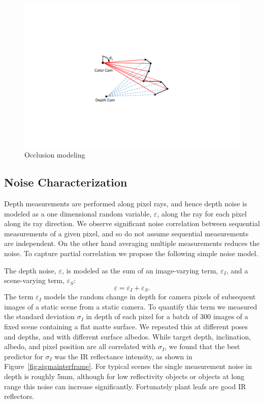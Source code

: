 \begin{figure}
\begin{center}
   \includegraphics[trim=130 90 140 90,clip,width=0.75\linewidth]{Figures/OcclusionModeling}
\end{center}
   \caption{Occlusion modeling }
\label{fig:occlusion}
\end{figure}


\subsection{Noise Characterization}
\label{sec:noise}

Depth measurements are performed along pixel rays, and hence depth noise is modeled as a one dimensional random variable, $\varepsilon$, along the ray for each pixel along its ray direction.  We observe significant noise correlation between sequential measurements of a given pixel, and so do not assume sequential measurements are independent.  On the other hand averaging multiple measurements reduces the noise.  To capture partial correlation we propose the following simple noise model. 

The depth noise, $\varepsilon$, is modeled as the sum of an image-varying term, $\varepsilon_I$, and a scene-varying term, $\varepsilon_S$:
\begin{equation}
\varepsilon = \varepsilon_I + \varepsilon_S. \label{eq:epsilon}
\end{equation}
The term $\varepsilon_I$ models the random change in depth for camera pixels of subsequent images of a static scene from a static camera.  To quantify this term we measured the standard deviation $\sigma_I$ in depth of each pixel for a batch of 300 images of a fixed scene containing a flat matte surface.  We repeated this at different poses and depths, and with different surface albedos.  While target depth, inclination, albedo, and pixel position are all correlated with $\sigma_I$, we found that the best predictor for $\sigma_I$ was the IR reflectance intensity, as shown in Figure~\ref{fig:sigmainterframe}.  For typical scenes the single measurement noise in depth is roughly 5mm, although for low reflectivity objects or objects at long range this noise can increase significantly.  Fortunately plant leafs are good IR reflectors.

